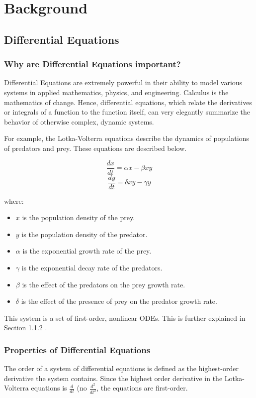 \section{Background}
\label{section:background}
\subsection{Differential Equations}
\subsubsection{Why are Differential Equations important?}
Differential Equations are extremely powerful in their ability to model various systems in applied mathematics, physics, and engineering. Calculus is the mathematics of change. Hence, differential equations, which relate the derivatives or integrals of a function to the function itself, can very elegantly summarize the behavior of otherwise complex, dynamic systems.

For example, the Lotka-Volterra equations describe the dynamics of populations of predators and prey. These equations are described below.

\[\frac{dx}{dt} = \alpha x - \beta x y\]
\[\frac{dy}{dt} = \delta x y - \gamma y\]

\noindent
where:
\begin{itemize}
    \item $x$ is the population density of the prey.
    \item $y$ is the population density of the predator.
    \item $\alpha$ is the exponential growth rate of the prey.
    \item $\gamma$ is the exponential decay rate of the predators.
    \item $\beta$ is the effect of the predators on the prey growth rate.
    \item $\delta$ is the effect of the presence of prey on the predator growth rate.
\end{itemize}

This system is a set of first-order, nonlinear ODEs. This is further explained in Section \ref{subsubsection:properties_differential} .

\subsubsection{Properties of Differential Equations}
\label{subsubsection:properties_differential}
\begin{definition}
    The order of a system of differential equations is defined as the highest-order derivative the system contains. Since the highest order derivative in the Lotka-Volterra equations is $\frac{d}{dt}$ (no $\frac{d^2}{{dt}^2}$, the equations are first-order.
\end{definition}

